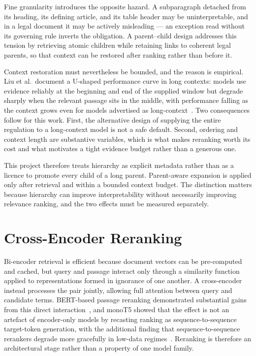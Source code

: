 Fine granularity introduces the opposite hazard. A subparagraph detached from its heading, its defining article, and its table header may be uninterpretable, and in a legal document it may be actively misleading --- an exception read without its governing rule inverts the obligation. A parent--child design addresses this tension by retrieving atomic children while retaining links to coherent legal parents, so that context can be restored after ranking rather than before it.

Context restoration must nevertheless be bounded, and the reason is empirical. Liu et al.\ document a U-shaped performance curve in long contexts: models use evidence reliably at the beginning and end of the supplied window but degrade sharply when the relevant passage sits in the middle, with performance falling as the context grows even for models advertised as long-context~\cite{liu2024lostmiddle}. Two consequences follow for this work. First, the alternative design of supplying the entire regulation to a long-context model is not a safe default. Second, ordering and context length are substantive variables, which is what makes reranking worth its cost and what motivates a tight evidence budget rather than a generous one.

This project therefore treats hierarchy as explicit metadata rather than as a licence to promote every child of a long parent. Parent-aware expansion is applied only after retrieval and within a bounded context budget. The distinction matters because hierarchy can improve interpretability without necessarily improving relevance ranking, and the two effects must be measured separately.

\section{Cross-Encoder Reranking}
\label{sec:sota-rerank}

Bi-encoder retrieval is efficient because document vectors can be pre-computed and cached, but query and passage interact only through a similarity function applied to representations formed in ignorance of one another. A cross-encoder instead processes the pair jointly, allowing full attention between query and candidate terms. BERT-based passage reranking demonstrated substantial gains from this direct interaction~\cite{nogueira2019reranking}, and monoT5 showed that the effect is not an artefact of encoder-only models by recasting ranking as sequence-to-sequence target-token generation, with the additional finding that sequence-to-sequence rerankers degrade more gracefully in low-data regimes~\cite{nogueira2020monot5}. Reranking is therefore an architectural stage rather than a property of one model family.

